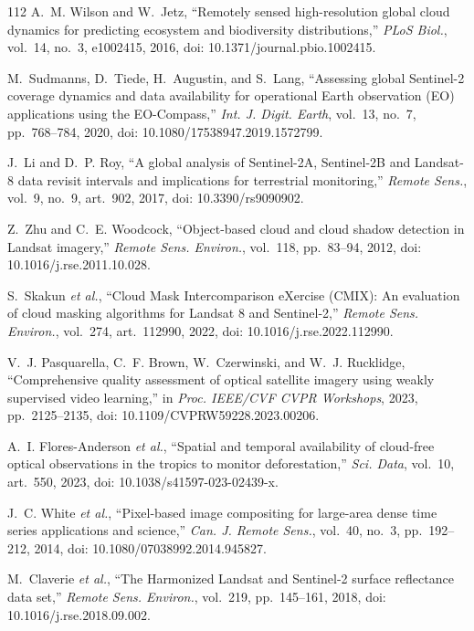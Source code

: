\documentclass[conference,a4paper]{IEEEtran}
\begin{document}
\begin{thebibliography}{112}
A.~M. Wilson and W.~Jetz, ``Remotely sensed high-resolution global cloud dynamics for predicting ecosystem and biodiversity distributions,'' \textit{PLoS Biol.}, vol.~14, no.~3, e1002415, 2016, doi: 10.1371/journal.pbio.1002415.

M.~Sudmanns, D.~Tiede, H.~Augustin, and S.~Lang, ``Assessing global Sentinel-2 coverage dynamics and data availability for operational Earth observation (EO) applications using the EO-Compass,'' \textit{Int. J. Digit. Earth}, vol.~13, no.~7, pp.~768--784, 2020, doi: 10.1080/17538947.2019.1572799.

J.~Li and D.~P. Roy, ``A global analysis of Sentinel-2A, Sentinel-2B and Landsat-8 data revisit intervals and implications for terrestrial monitoring,'' \textit{Remote Sens.}, vol.~9, no.~9, art.~902, 2017, doi: 10.3390/rs9090902.

Z.~Zhu and C.~E. Woodcock, ``Object-based cloud and cloud shadow detection in Landsat imagery,'' \textit{Remote Sens. Environ.}, vol.~118, pp.~83--94, 2012, doi: 10.1016/j.rse.2011.10.028.

S.~Skakun \textit{et al.}, ``Cloud Mask Intercomparison eXercise (CMIX): An evaluation of cloud masking algorithms for Landsat 8 and Sentinel-2,'' \textit{Remote Sens. Environ.}, vol.~274, art.~112990, 2022, doi: 10.1016/j.rse.2022.112990.

V.~J. Pasquarella, C.~F. Brown, W.~Czerwinski, and W.~J. Rucklidge, ``Comprehensive quality assessment of optical satellite imagery using weakly supervised video learning,'' in \textit{Proc. IEEE/CVF CVPR Workshops}, 2023, pp.~2125--2135, doi: 10.1109/CVPRW59228.2023.00206.

A.~I. Flores-Anderson \textit{et al.}, ``Spatial and temporal availability of cloud-free optical observations in the tropics to monitor deforestation,'' \textit{Sci. Data}, vol.~10, art.~550, 2023, doi: 10.1038/s41597-023-02439-x.

J.~C. White \textit{et al.}, ``Pixel-based image compositing for large-area dense time series applications and science,'' \textit{Can. J. Remote Sens.}, vol.~40, no.~3, pp.~192--212, 2014, doi: 10.1080/07038992.2014.945827.

M.~Claverie \textit{et al.}, ``The Harmonized Landsat and Sentinel-2 surface reflectance data set,'' \textit{Remote Sens. Environ.}, vol.~219, pp.~145--161, 2018, doi: 10.1016/j.rse.2018.09.002.


\end{thebibliography}
\end{document}
